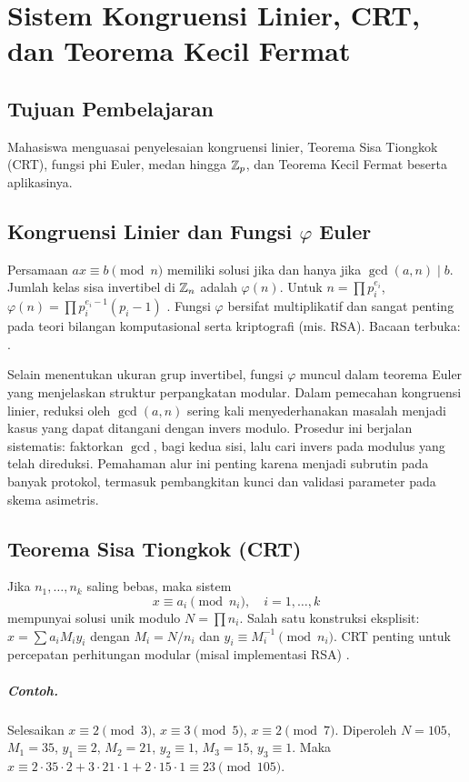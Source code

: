 \documentclass[../main.tex]{subfiles}
\begin{document}
\chapter{Sistem Kongruensi Linier, CRT, dan Teorema Kecil Fermat}

\section{Tujuan Pembelajaran}
Mahasiswa menguasai penyelesaian kongruensi linier, Teorema Sisa Tiongkok (CRT), fungsi phi Euler, medan hingga \(\mathbb{Z}_p\), dan Teorema Kecil Fermat beserta aplikasinya.

\section{Kongruensi Linier dan Fungsi \(\varphi\) Euler}
Persamaan \(ax\equiv b\pmod n\) memiliki solusi jika dan hanya jika \(\gcd(a,n)\mid b\). Jumlah kelas sisa invertibel di \(\mathbb{Z}_n\) adalah \(\varphi(n)\). Untuk \(n=\prod p_i^{e_i}\), \(\varphi(n)=\prod p_i^{e_i-1}(p_i-1)\) \citep{hoffstein}. Fungsi \(\varphi\) bersifat multiplikatif dan sangat penting pada teori bilangan komputasional serta kriptografi (mis. RSA). Bacaan terbuka: \citep{shoup_nt}.

Selain menentukan ukuran grup invertibel, fungsi \(\varphi\) muncul dalam teorema Euler yang menjelaskan struktur perpangkatan modular. Dalam pemecahan kongruensi linier, reduksi oleh \(\gcd(a,n)\) sering kali menyederhanakan masalah menjadi kasus yang dapat ditangani dengan invers modulo. Prosedur ini berjalan sistematis: faktorkan \(\gcd\), bagi kedua sisi, lalu cari invers pada modulus yang telah direduksi. Pemahaman alur ini penting karena menjadi subrutin pada banyak protokol, termasuk pembangkitan kunci dan validasi parameter pada skema asimetris.

\section{Teorema Sisa Tiongkok (CRT)}
Jika \(n_1,\dots,n_k\) saling bebas, maka sistem
\[ x\equiv a_i \pmod{n_i},\quad i=1,\dots,k \]
mempunyai solusi unik modulo \(N=\prod n_i\). Salah satu konstruksi eksplisit: \(x=\sum a_i M_i y_i\) dengan \(M_i=N/n_i\) dan \(y_i\equiv M_i^{-1}\pmod{n_i}\). CRT penting untuk percepatan perhitungan modular (misal implementasi RSA) \citep{menezes}.

\paragraph{Contoh.} Selesaikan \(x\equiv 2\pmod 3\), \(x\equiv 3\pmod 5\), \(x\equiv 2\pmod 7\). Diperoleh \(N=105\), \(M_1=35\), \(y_1\equiv 2\), \(M_2=21\), \(y_2\equiv 1\), \(M_3=15\), \(y_3\equiv 1\). Maka \(x\equiv 2\cdot35\cdot2+3\cdot21\cdot1+2\cdot15\cdot1\equiv 23\pmod{105}\).
\end{document}
